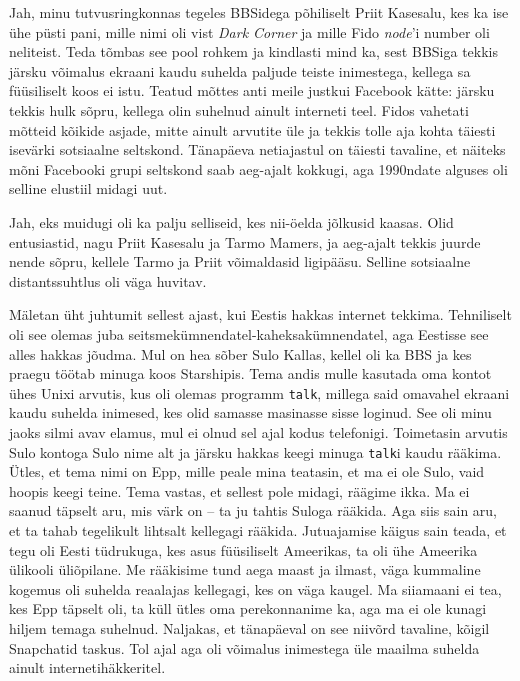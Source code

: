 Jah, minu tutvusringkonnas tegeles BBSidega põhiliselt Priit 
Kasesalu, kes 
ka ise ühe püsti pani, mille nimi oli vist \emph{Dark Corner} ja mille Fido \emph{node}'i number oli neliteist. 
Teda tõmbas see pool rohkem ja 
kindlasti mind ka, sest BBSiga tekkis järsku võimalus ekraani kaudu suhelda 
paljude teiste inimestega, kellega sa füüsiliselt koos ei istu. 
Teatud mõttes anti meile justkui 
Facebook kätte: 
järsku tekkis hulk sõpru, kellega olin suhelnud ainult interneti teel. Fidos 
vahetati mõtteid kõikide asjade, mitte ainult arvutite üle ja tekkis 
tolle aja kohta täiesti isevärki sotsiaalne seltskond. Tänapäeva netiajastul on 
täiesti tavaline, et näiteks mõni Facebooki grupi seltskond saab aeg-ajalt 
kokkugi, aga 1990ndate alguses oli selline elustiil midagi uut.


Jah, eks muidugi oli ka palju selliseid, kes nii-öelda jõlkusid kaasas. Olid 
entusiastid, nagu Priit Kasesalu 
ja Tarmo Mamers, ja aeg-ajalt tekkis juurde nende 
sõpru, kellele Tarmo ja Priit võimaldasid 
ligipääsu. Selline sotsiaalne 
distantssuhtlus oli väga huvitav. 

Mäletan üht juhtumit sellest ajast, kui Eestis hakkas internet tekkima. 
Tehniliselt oli see olemas juba 
seitsmekümnendatel-kaheksakümnendatel, aga Eestisse see alles hakkas jõudma. 
Mul on hea sõber 
Sulo Kallas, kellel oli ka BBS ja kes praegu 
töötab minuga koos Starshipis. Tema andis 
mulle kasutada oma kontot ühes Unixi arvutis, kus oli olemas 
programm \verb|talk|, millega said omavahel ekraani kaudu suhelda 
inimesed, kes olid samasse masinasse sisse loginud. See oli minu 
jaoks silmi avav elamus, mul ei olnud sel ajal 
kodus telefonigi. Toimetasin arvutis Sulo kontoga Sulo nime alt 
ja järsku hakkas keegi minuga \verb|talk|i kaudu 
rääkima. Ütles, et tema nimi on Epp, mille peale mina teatasin, et ma ei ole 
Sulo, vaid hoopis keegi
teine. Tema vastas, et sellest pole midagi, räägime ikka. Ma ei 
saanud täpselt aru, mis värk on – ta ju tahtis Suloga rääkida. Aga siis sain 
aru, et ta tahab tegelikult lihtsalt kellegagi 
rääkida.  
Jutuajamise käigus sain teada, et  
tegu oli Eesti tüdrukuga, kes asus füüsiliselt 
Ameerikas, ta oli ühe Ameerika ülikooli üliõpilane. 
Me rääkisime tund aega maast ja ilmast, väga kummaline kogemus oli suhelda 
reaalajas kellegagi, kes on väga kaugel. Ma siiamaani ei tea, 
kes Epp täpselt oli, ta küll ütles oma perekonnanime ka, aga ma ei ole kunagi 
hiljem temaga suhelnud. Naljakas, et 
tänapäeval on see niivõrd tavaline, kõigil Snapchatid taskus. Tol ajal aga oli 
võimalus 
inimestega üle maailma suhelda ainult internetihäkkeritel.

